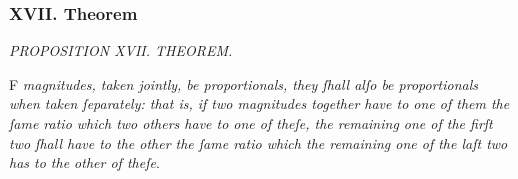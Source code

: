 \documentclass[11pt,preview]{standalone}
\begin{document}
\subsubsection{XVII. Theorem}

\begin{minipage}{\textwidth}
    \begin{center}
        \textit{PROPOSITION XVII. THEOREM.}\label{book5pr17} \\
    \end{center}

    \hfill

    \begin{center}
        \raggedright \lettrine[lines=3, loversize=1, nindent=0pt]{}{}F \textit{magnitudes, taken jointly, be proportionals, they ſhall alſo be proportionals when taken ſeparately: that is, if two magnitudes together have to one of them the ſame ratio which two others have to one of theſe, the remaining one of the firſt two ſhall have to the other the ſame ratio which the remaining one of the laſt two has to the other of theſe}.
    \end{center}
\end{minipage}

\hfill

\hfill
\end{document}
